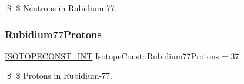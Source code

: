 \$ \$ Neutrons in Rubidium-\/77. \mbox{\label{group___isotope_const-_rubidium-_rb77_gaa909b97a93e6c38846b2b87d04fb68cf}} 
\subsubsection{\texorpdfstring{Rubidium77\+Protons}{Rubidium77Protons}}
{\footnotesize\ttfamily \mbox{\hyperlink{group___isotope_const-_macros_ga5f18360b3e99483a35c32d789e62621c}{I\+S\+O\+T\+O\+P\+E\+C\+O\+N\+S\+T\+\_\+\+I\+NT}} Isotope\+Const\+::\+Rubidium77\+Protons = 37}

\$ \$ Protons in Rubidium-\/77. 